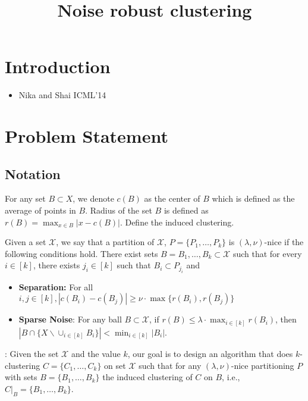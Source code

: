 \documentclass[11pt]{article}
\title{\LARGE Noise robust clustering}
\author{}
\begin{document}
\maketitle

\section{Introduction}
\begin{itemize}
\item Nika and Shai ICML'14
\end{itemize}

\section{Problem Statement}

\subsection{Notation}
For any set $B\subset X$, we denote $c(B)$ as the center of $B$ which is defined as the average of points in $B$. Radius of the set $B$ is defined as $r(B)=\max_{x\in B} |x-c(B)|$. Define the induced clustering.

\begin{definition}
Given a set $\mathcal{X}$, we say that a partition of $\mathcal{X}$, $P=\{P_1,\ldots,P_k\}$ is $(\lambda,\nu)$-nice if the following conditions hold. There exist sets $B=B_1,\ldots,B_k\subset \mathcal{X}$ such that for every $i\in[k]$, there exists $j_i\in[k]$ such that $B_i\subset P_{j_i}$ and
\begin{itemize}
\item{\bf{Separation}:} For all $i,j\in[k], |c(B_i)-c(B_j)|\geq \nu\cdot\max\{r(B_i),r(B_j)\}$
\item{\bf{Sparse Noise}}: For any ball $B\subset \mathcal{X}$, if $r(B)\leq \lambda \cdot \max_{i\in[k]} r(B_i)$, then $|B\cap \{X \backslash \cup_{i\in[k]} B_i\}| < \min_{i\in[k]}|B_i|$.
\end{itemize}
\end{definition}


: Given the set $\mathcal{X}$ and the value $k$, our goal is to design an algorithm that does $k$-clustering $C=\{C_1,\ldots,C_k\}$ on set $\mathcal{X}$ such that  for any $(\lambda,\nu)$-nice partitioning $P$ with sets $B = \{B_1,\ldots,B_k\}$ the induced clustering of $C$ on $B$, i.e., $C|_B = \{B_1,\ldots,B_k\}$. 
\end{document}
